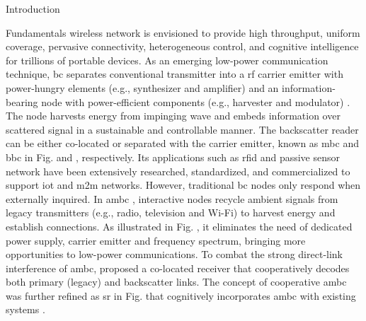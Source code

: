 \documentclass[journal]{IEEEtran}
\begin{document}
\begin{section}{Introduction}
	\begin{subsection}{Fundamentals}
		 wireless network is envisioned to provide high throughput, uniform coverage, pervasive connectivity, heterogeneous control, and cognitive intelligence for trillions of portable devices.
		As an emerging low-power communication technique, \gls{bc} separates conventional transmitter into a \gls{rf} carrier emitter with power-hungry elements (e.g., synthesizer and amplifier) and an information-bearing node with power-efficient components (e.g., harvester and modulator) \cite{Boyer2014}.
		The node harvests energy from impinging wave and embeds information over scattered signal in a sustainable and controllable manner.
		The backscatter reader can be either co-located or separated with the carrier emitter, known as \gls{mbc} and \gls{bbc} in Fig.  and , respectively.
		Its applications such as \gls{rfid} \cite{Dobkin2012,Landt2005} and passive sensor network \cite{Vannucci2008,Assimonis2016} have been extensively researched, standardized, and commercialized to support \gls{iot} and \gls{m2m} networks.
		However, traditional \gls{bc} nodes only respond when externally inquired.
		In \gls{ambc} \cite{Liu2013b}, interactive nodes recycle ambient signals from legacy transmitters (e.g., radio, television and Wi-Fi) to harvest energy and establish connections.
		As illustrated in Fig. , it eliminates the need of dedicated power supply, carrier emitter and frequency spectrum, bringing more opportunities to low-power communications.
		To combat the strong direct-link interference of \gls{ambc}, \cite{Yang2018} proposed a co-located receiver that cooperatively decodes both primary (legacy) and backscatter links.
		The concept of cooperative \gls{ambc} was further refined as \gls{sr} in Fig.  that cognitively incorporates \gls{ambc} with existing systems \cite{Liang2020}.

\end{subsection}
\end{section}
\end{document}
